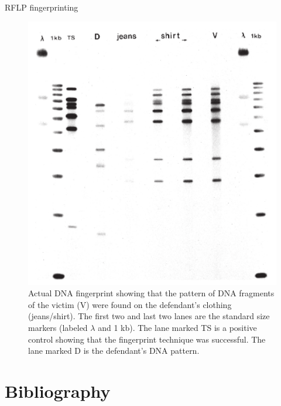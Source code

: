 \documentclass[ignorenonframetext,aspectratio=169]{beamer}
\begin{document}
\begin{frame}{RFLP fingerprinting}
\protect\hypertarget{rflp-fingerprinting-1}{}

\begin{figure}
\includegraphics[width=0.4\linewidth]{../images/fingerprint_lanes} \caption{Actual DNA fingerprint showing that the pattern of DNA fragments of the victim (V) were found on the defendant's clothing (jeans/shirt). The first two and last two lanes are the standard size markers (labeled $\lambda$ and 1 kb). The lane marked TS is a positive control showing that the fingerprint technique was successful. The lane marked D is the defendant's DNA pattern.}\label{fig:fingerprint-lanes}
\end{figure}

\end{frame}

\hypertarget{bibliography}{%
\section{Bibliography}\label{bibliography}}
\end{document}
